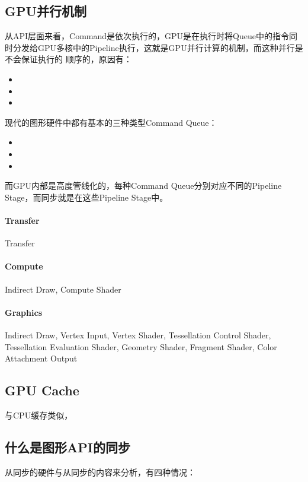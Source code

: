 \subsection{GPU并行机制}
从API层面来看，Command是依次执行的，GPU是在执行时将Queue中的指令同时分发给GPU多核中的Pipeline执行，这就是GPU并行计算的机制，而这种并行是不会保证执行的
顺序的，原因有：
\begin{itemize}
    \item {}
    \item {}
    \item {}
\end{itemize}
现代的图形硬件中都有基本的三种类型Command Queue：
\begin{itemize}
    \item {}
    \item {}
    \item {}
\end{itemize}
而GPU内部是高度管线化的，每种Command Queue分别对应不同的Pipeline Stage，而同步就是在这些Pipeline Stage中。
\paragraph{Transfer}
Transfer
\paragraph{Compute}
Indirect Draw, Compute Shader
\paragraph{Graphics}
Indirect Draw, Vertex Input, Vertex Shader, Tessellation Control Shader, 
Tessellation Evaluation Shader, Geometry Shader, Fragment Shader, Color Attachment Output

    
\subsection{GPU Cache}
与CPU缓存类似，

\subsection{什么是图形API的同步}
从同步的硬件与从同步的内容来分析，有四种情况：

